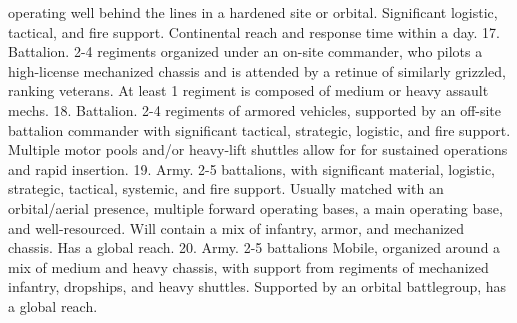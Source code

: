     operating well behind the lines in a hardened site or orbital. Significant logistic, tactical,  
    and fire support. Continental reach and response time within a day.   
17. Battalion. 2-4 regiments organized under an on-site commander, who pilots a high-license  
    mechanized chassis and is attended by a retinue of similarly grizzled, ranking veterans. At  
    least 1 regiment is composed of medium or heavy assault mechs.   
18. Battalion. 2-4 regiments of armored vehicles, supported by an off-site battalion  
    commander with significant tactical, strategic, logistic, and fire support. Multiple motor  
    pools and/or heavy-lift shuttles allow for for sustained operations and rapid insertion.   
19. Army. 2-5 battalions, with significant material, logistic, strategic, tactical, systemic, and fire  
    support. Usually matched with an orbital/aerial presence, multiple forward operating  
    bases, a main operating base, and well-resourced. Will contain a mix of infantry, armor,  
    and mechanized chassis. Has a global reach.   
20. Army. 2-5 battalions Mobile, organized around a mix of medium and heavy chassis, with  
    support from regiments of mechanized infantry, dropships, and heavy shuttles. Supported  
    by an orbital battlegroup, has a global reach.    

                                                                                                        
                                                                                                          
                                                                                           